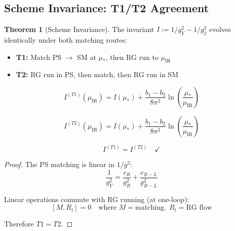\documentclass[11pt,a4paper]{article}
\theoremstyle{definition}
\newtheorem{theorem}{Theorem}[section]
\begin{document}
\subsection{Scheme Invariance: T1/T2 Agreement}
\label{subsec:scheme_inv}

\begin{theorem}[Scheme Invariance]
\label{thm:scheme_inv}
The invariant $I := 1/g_Y^2 - 1/g_2^2$ evolves identically under both matching routes:
\begin{itemize}
\item \textbf{T1:} Match PS $\to$ SM at $\mu_*$, then RG run to $\mu_{\text{IR}}$
\item \textbf{T2:} RG run in PS, then match, then RG run in SM
\end{itemize}
\end{theorem}

\begin{equation}
\label{eq:T1_route}
I^{(T1)}(\mu_{\text{IR}}) = I(\mu_*) + \frac{b_1 - b_2}{8\pi^2}\ln\left(\frac{\mu_*}{\mu_{\text{IR}}}\right)
\end{equation}

\begin{equation}
\label{eq:T2_route}
I^{(T2)}(\mu_{\text{IR}}) = I(\mu_*) + \frac{b_1 - b_2}{8\pi^2}\ln\left(\frac{\mu_*}{\mu_{\text{IR}}}\right)
\end{equation}

\begin{equation}
\label{eq:scheme_check}
\boxed{I^{(T1)} = I^{(T2)}} \quad \checkmark
\end{equation}

\begin{proof}
The PS matching is linear in $1/g^2$:
\begin{equation}
\label{eq:linear_matching}
\frac{1}{g_Y^2} = \frac{c_R}{g_R^2} + \frac{c_{B-L}}{g_{B-L}^2}
\end{equation}

Linear operations commute with RG running (at one-loop):
\begin{equation}
\label{eq:commutation}
[M, R_t] = 0 \quad \text{where } M = \text{matching}, \; R_t = \text{RG flow}
\end{equation}

Therefore $T1 = T2$.
\end{proof}

\end{document}
